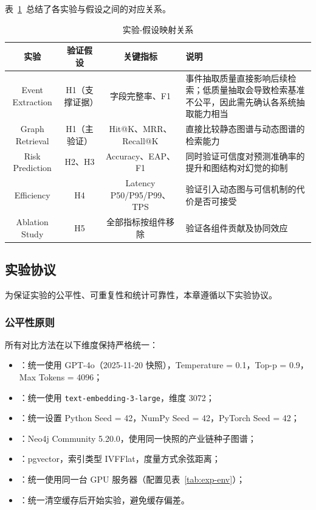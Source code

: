 表~\ref{tab:hypothesis-mapping}~总结了各实验与假设之间的对应关系。

\begin{table}[H]
\centering
\caption{实验-假设映射关系}
\label{tab:hypothesis-mapping}
\begin{tabularx}{0.95\linewidth}{c c c X}
\toprule
\textbf{实验} & \textbf{验证假设} & \textbf{关键指标} & \textbf{说明} \\
\midrule
Event Extraction & H1（支撑证据） & 字段完整率、F1 & 事件抽取质量直接影响后续检索；低质量抽取会导致检索基准不公平，因此需先确认各系统抽取能力相当 \\
Graph Retrieval & H1（主验证） & Hit@K、MRR、Recall@K & 直接比较静态图谱与动态图谱的检索能力 \\
Risk Prediction & H2、H3 & Accuracy、EAP、F1 & 同时验证可信度对预测准确率的提升和图结构对幻觉的抑制 \\
Efficiency & H4 & Latency P50/P95/P99、TPS & 验证引入动态图与可信机制的代价是否可接受 \\
Ablation Study & H5 & 全部指标按组件移除 & 验证各组件贡献及协同效应 \\
\bottomrule
\end{tabularx}
\end{table}

\subsection{实验协议}
\label{sec:exp-protocol}

为保证实验的公平性、可重复性和统计可靠性，本章遵循以下实验协议。

\subsubsection{公平性原则}

所有对比方法在以下维度保持严格统一：
\begin{itemize}
    \item {}：统一使用 GPT-4o（2025-11-20 快照），Temperature = 0.1，Top-p = 0.9，Max Tokens = 4096；
    \item {}：统一使用 \texttt{text-embedding-3-large}，维度 3072；
    \item {}：统一设置 Python Seed = 42，NumPy Seed = 42，PyTorch Seed = 42；
    \item {}：Neo4j Community 5.20.0，使用同一快照的产业链种子图谱；
    \item {}：pgvector，索引类型 IVFFlat，度量方式余弦距离；
    \item {}：统一使用同一台 GPU 服务器（配置见表~\ref{tab:exp-env}）；
    \item {}：统一清空缓存后开始实验，避免缓存偏差。
\end{itemize}

